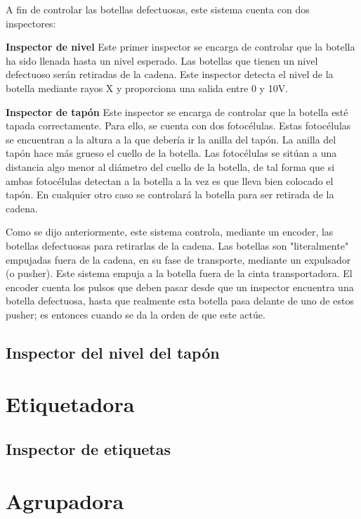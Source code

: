 \documentclass[11pt,a4paper,spanish,twoside]{report}
\begin{document}
A fin de controlar las botellas defectuosas, este sistema cuenta con dos 
inspectores:
\begin{description}
\item \textbf{Inspector de nivel}
Este primer inspector se encarga de controlar que la botella ha sido llenada 
hasta un nivel esperado. Las botellas que tienen un nivel defectuoso serán 
retiradas de la cadena. Este inspector detecta el nivel de la botella mediante 
rayos X y proporciona una salida entre 0 y 10V.

\item \textbf{Inspector de tapón}
Este inspector se encarga de controlar que la botella esté tapada 
correctamente. Para ello, se cuenta con dos fotocélulas. Estas fotocélulas se 
encuentran a la altura a la que debería ir la anilla del tapón. La anilla del 
tapón hace más grueso el cuello de la botella. Las fotocélulas se sitúan a una 
distancia algo menor al diámetro del cuello de la botella, de tal forma que si
ambas fotocélulas detectan a la botella a la vez es que lleva bien colocado el 
tapón. En cualquier otro caso se controlará la botella para ser retirada  de la
cadena.
\end{description}

Como se dijo anteriormente, este sistema controla, mediante un encoder, las 
botellas defectuosas para retirarlas de la cadena. Las botellas son 
"literalmente" empujadas fuera de la cadena, en su fase de transporte, mediante 
un expulsador (o pusher). Este sistema empuja a la botella fuera de la cinta 
transportadora. El encoder cuenta los pulsos que deben pasar desde que un  
inspector encuentra una botella defectuosa, hasta que realmente esta botella 
pasa delante de uno de estos pusher; es entonces cuando se da la orden de que 
este actúe.

\subsection{Inspector del nivel del tapón}
\section{Etiquetadora}
\subsection{Inspector de etiquetas}
\section{Agrupadora}
\end{document}
